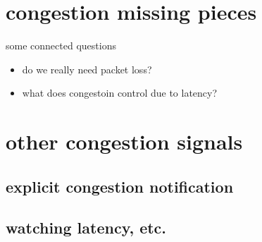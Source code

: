 \section{congestion missing pieces}
\begin{frame}{some connected questions}
    \begin{itemize}
    \item do we really need packet loss?
    \item what does congestoin control due to latency?
    \end{itemize}
\end{frame}

\section{other congestion signals}



\subsection{explicit congestion notification}


\subsection{watching latency, etc.}




